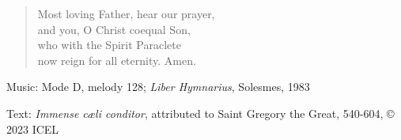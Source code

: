 \hymn



\setlength{\leftmargini}{2em}
\begin{verse}
Most loving Father, hear our prayer,\\
and you, O Christ coequal Son,\\
who with the Spirit Paraclete\\
now reign for all eternity. Amen.
\end{verse}
\setlength{\leftmargini}{\defleftmargini}

\begin{hymnsource}
Music: Mode D, melody 128; \emph{Liber Hymnarius}, Solesmes, 1983

Text: \emph{Immense cæli conditor}, attributed to Saint Gregory the Great, 540-604, © 2023 ICEL
\end{hymnsource}
